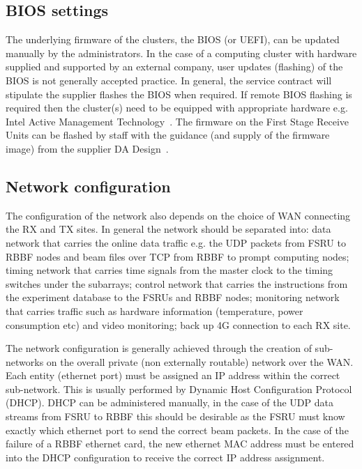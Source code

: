 \documentclass[12pt,a4paper]{article}
\begin{document}
\subsection{BIOS settings} \label{ssec:bios} %
The underlying firmware of the clusters, the BIOS (or UEFI), can be updated manually by the administrators.
In the case of a computing cluster with hardware supplied and supported by an external company, user updates (flashing) of the BIOS is not generally accepted practice.
In general, the service contract will stipulate the supplier flashes the BIOS when required.
If remote BIOS flashing is required then the cluster(s) need to be equipped with appropriate hardware e.g. Intel Active Management Technology~\cite{intel-amt}.
The firmware on the First Stage Receive Units can be flashed by \EC staff with the guidance (and supply of the firmware image) from the supplier DA Design~\cite{da-design}.

\subsection{Network configuration} \label{ssec:network}

The configuration of the network also depends on the choice of WAN connecting the RX and TX sites.
In general the network should be separated into: data network that carries the online data traffic e.g. the UDP packets from FSRU to RBBF nodes and beam files over TCP from RBBF to prompt computing nodes; timing network that carries time signals from the master clock to the timing switches under the subarrays; control network that carries the instructions from the experiment database to the FSRUs and RBBF nodes; monitoring network that carries traffic such as hardware information (temperature, power consumption etc) and video monitoring; back up 4G connection to each RX site.

The network configuration is generally achieved through the creation of sub-networks on the overall private (non externally routable) network over the WAN.
Each entity (ethernet port) must be assigned an IP address within the correct sub-network.
This is usually performed by Dynamic Host Configuration Protocol~\cite{dhcp}  (DHCP).
DHCP can be administered manually, in the case of the UDP data streams from FSRU to RBBF this should be desirable as the FSRU must know exactly which ethernet port to send the correct beam packets.
In the case of the failure of a RBBF ethernet card, the new ethernet MAC address must be entered into the DHCP configuration to receive the correct IP address assignment.
\end{document}
